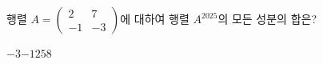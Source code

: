 \hspace*{2mm}\begin{minipage}[t]{\dimexpr\linewidth-2mm\relax}\vspace{0pt}
행렬 $A=\begin{pmatrix} 2 & 7 \\ -1 & -3 \end{pmatrix}$에 대하여 행렬 $A^{2025}$의 모든 성분의 합은?
\begin{choices32}{$-3$}{$-1$}{$2$}{$5$}{$8$}\end{choices32}\end{minipage}
